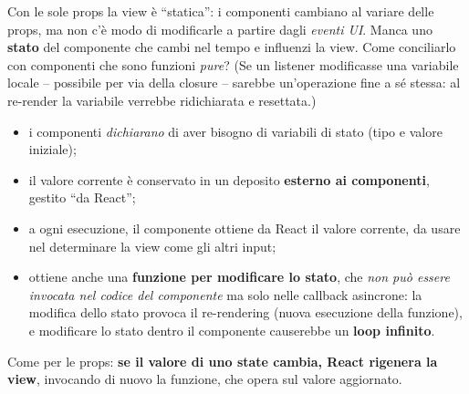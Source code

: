 Con le sole props la view \`e ``statica'': i componenti cambiano al variare delle props, ma
non c'\`e modo di modificarle a partire dagli \emph{eventi UI}. Manca uno \textbf{stato} del
componente che cambi nel tempo e influenzi la view. Come conciliarlo con componenti che sono
funzioni \emph{pure}? (Se un listener modificasse una variabile locale -- possibile per via
della closure -- sarebbe un'operazione fine a s\'e stessa: al re-render la variabile verrebbe
ridichiarata e resettata.)
\begin{itemize}
  \item i componenti \emph{dichiarano} di aver bisogno di variabili di stato (tipo e valore
        iniziale);
  \item il valore corrente \`e conservato in un deposito \textbf{esterno ai componenti},
        gestito ``da React'';
  \item a ogni esecuzione, il componente ottiene da React il valore corrente, da usare nel
        determinare la view come gli altri input;
  \item ottiene anche una \textbf{funzione per modificare lo stato}, che \emph{non pu\`o
        essere invocata nel codice del componente} ma solo nelle callback asincrone: la
        modifica dello stato provoca il re-rendering (nuova esecuzione della funzione), e
        modificare lo stato dentro il componente causerebbe un \textbf{loop infinito}.
\end{itemize}
\begin{importante}
Come per le props: \textbf{se il valore di uno state cambia, React rigenera la view},
invocando di nuovo la funzione, che opera sul valore aggiornato.
\end{importante}

